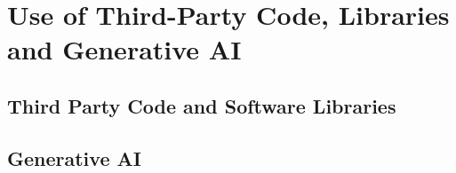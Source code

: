\chapter{Use of Third-Party Code, Libraries and Generative AI}

\section{Third Party Code and Software Libraries}


\section{Generative AI}

